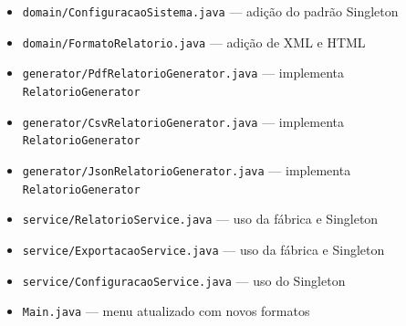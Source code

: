 \documentclass[12pt, a4paper]{article}
\begin{document}
\begin{itemize}
    \item \texttt{domain/ConfiguracaoSistema.java} --- adição do padrão Singleton
    \item \texttt{domain/FormatoRelatorio.java} --- adição de XML e HTML
    \item \texttt{generator/PdfRelatorioGenerator.java} --- implementa \texttt{RelatorioGenerator}
    \item \texttt{generator/CsvRelatorioGenerator.java} --- implementa \texttt{RelatorioGenerator}
    \item \texttt{generator/JsonRelatorioGenerator.java} --- implementa \texttt{RelatorioGenerator}
    \item \texttt{service/RelatorioService.java} --- uso da fábrica e Singleton
    \item \texttt{service/ExportacaoService.java} --- uso da fábrica e Singleton
    \item \texttt{service/ConfiguracaoService.java} --- uso do Singleton
    \item \texttt{Main.java} --- menu atualizado com novos formatos
\end{itemize}
\end{document}
